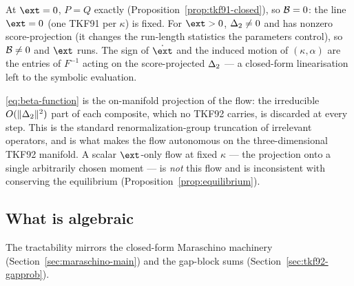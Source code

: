 \begin{corollary}
\label{cor:fixed-line}
At $\ext=0$, $P=Q$ exactly (Proposition~\ref{prop:tkf91-closed}), so
$\mathcal{B}=0$: the line $\ext=0$ (one TKF91 per $\kappa$) is fixed.  For
$\ext>0$, $\Delta_2\neq0$ and has nonzero score-projection (it changes
the run-length statistics the parameters control), so $\mathcal{B}\neq0$ and
$\ext$ runs.  The sign of $\dot\ext$ and the induced motion of
$(\kappa,\alpha)$ are the entries of $F^{-1}$ acting on the score-projected
$\Delta_2$ --- a closed-form linearisation left to the symbolic
evaluation.
\end{corollary}

\begin{remark}
\eqref{eq:beta-function} is the on-manifold projection of the flow: the
irreducible $O(\|\Delta_2\|^2)$ part of each composite, which no TKF92
carries, is discarded at every step.  This is the standard
renormalization-group truncation of irrelevant operators, and is what makes
the flow autonomous on the three-dimensional TKF92 manifold.  A scalar
$\ext$-only flow at fixed $\kappa$ --- the projection onto a single
arbitrarily chosen moment --- is \emph{not} this flow and is inconsistent
with conserving the equilibrium (Proposition~\ref{prop:equilibrium}).
\end{remark}

\subsection{What is algebraic}
\label{sec:comp-algebraic}

The tractability mirrors the closed-form Maraschino machinery
(Section~\ref{sec:maraschino-main}) and the gap-block sums
(Section~\ref{sec:tkf92-gapprob}).

